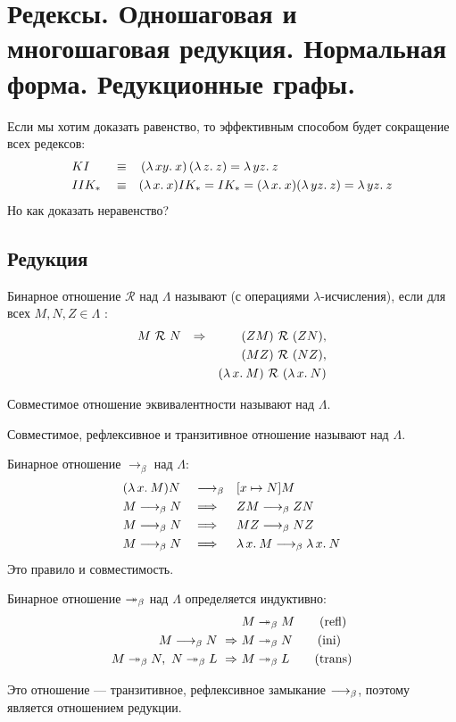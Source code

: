 \documentclass[11pt,a4paper]{article}
\begin{document}
\section{Редексы. Одношаговая и многошаговая редукция. Нормальная форма. Редукционные графы.}
Если мы хотим доказать равенство, то эффективным способом будет сокращение всех редексов:
\[
\begin{aligned}
	& KI &&\equiv && \left( \lambda\,{xy}.\:{x} \right) \left( \lambda\,{z}.\:{z} \right) = \lambda\,{yz}.\:{z} \\
	& I I K_{*} &&\equiv && (\lambda\,{x}.\:{x})I K_{*} = IK_{*} = (\lambda\,{x}.\:{x})(\lambda\,{y z}.\:{z}) = \lambda\,{yz}.\:{z}
\end{aligned}
\]
Но как доказать неравенство?
\subsection{Редукция}
\begin{defn}
	Бинарное отношение $ \mathcal{R}$ над $ \Lambda$ называют  (с операциями $ \lambda$-исчисления), если для всех $ M, N, Z \in \Lambda$ :
	\[
	\begin{aligned}
		M ~\mathcal{R} ~N && \Rightarrow  && (ZM) ~ \mathcal{R} ~ (ZN), \\
						  &&&& (MZ) ~ \mathcal{R} ~(NZ), \\
						  &&&& (\lambda\,{x}.\:{M}) ~\mathcal{R}~(\lambda\,{x}.\:{N})
	\end{aligned}
	\]
\end{defn}
\begin{defn}
     Совместимое отношение эквивалентности называют  над $ \Lambda$.

	 \noindent
	 Совместимое, рефлексивное и транзитивное отношение называют  над $ \Lambda$.
\end{defn}

\begin{defn}
	Бинарное отношение  $ \to_{\beta}$ над $ \Lambda$:
	\[
	\begin{aligned}
		&(\lambda\,{x}.\:{M})N &&\longrightarrow_{\beta}&& [x \mapsto N] M \\ 
		&M \longrightarrow_{\beta} N && \Longrightarrow && ZM \longrightarrow_{\beta} ZN \\
		&M \longrightarrow_{\beta} N && \Longrightarrow && MZ \longrightarrow_{\beta} NZ \\
		&M \longrightarrow_{\beta} N && \Longrightarrow && \lambda\,{x}.\:{M} \longrightarrow_{\beta} \lambda\,{x}.\:{N} \\
	\end{aligned}
	\]
	Это правило и совместимость.
\end{defn}
\begin{defn}    
	Бинарное отношение  $ \twoheadrightarrow_{\beta}$ над $ \Lambda$ определяется индуктивно:
\begin{align*}
	&M \twoheadrightarrow_{\beta} M   \tag{refl} \\
	M \longrightarrow_{\beta} N ~\Rightarrow~ &  M \twoheadrightarrow_{\beta} N  \tag{ini} \\
	M \twoheadrightarrow_{\beta} N, ~ N \twoheadrightarrow_{\beta} L ~\Rightarrow ~&  M \twoheadrightarrow_{\beta} L  \tag{trans}
\end{align*}
\end{defn}
Это отношение --- транзитивное, рефлексивное замыкание $ \longrightarrow_{\beta}$, поэтому является отношением редукции. 
\end{document}
